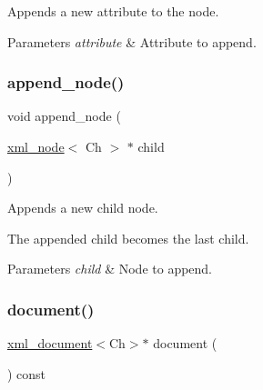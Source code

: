 Appends a new attribute to the node. 


\begin{DoxyParams}{Parameters}
{\em attribute} & Attribute to append. \\
\hline
\end{DoxyParams}
\mbox{\label{classrapidxml_1_1xml__node_a86de2e22276826089b7baed2599f8dee}} 
\subsubsection{\texorpdfstring{append\+\_\+node()}{append\_node()}}
{\footnotesize\ttfamily void append\+\_\+node (\begin{DoxyParamCaption}\item[{\mbox{\hyperlink{classrapidxml_1_1xml__node}{xml\+\_\+node}}$<$ Ch $>$ $\ast$}]{child }\end{DoxyParamCaption})\hspace{0.3cm}{\ttfamily [inline]}}



Appends a new child node. 

The appended child becomes the last child. 
\begin{DoxyParams}{Parameters}
{\em child} & Node to append. \\
\hline
\end{DoxyParams}
\mbox{\label{classrapidxml_1_1xml__node_ae5396d92d09394b37838f2518f430da4}} 
\subsubsection{\texorpdfstring{document()}{document()}}
{\footnotesize\ttfamily \mbox{\hyperlink{classrapidxml_1_1xml__document}{xml\+\_\+document}}$<$Ch$>$$\ast$ document (\begin{DoxyParamCaption}{ }\end{DoxyParamCaption}) const\hspace{0.3cm}{\ttfamily [inline]}}



